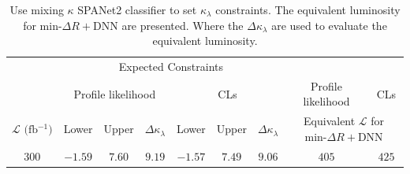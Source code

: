 \documentclass[12pt]{article}
\begin{document}
	\begin{table}[htpb]
		\centering
		\caption{Use mixing $\kappa$ SPANet2 classifier to set $\kappa_\lambda$ constraints. The equivalent luminosity for $\text{min-}\Delta R + \text{DNN}$ are presented. Where the $\Delta \kappa_\lambda$ are used to evaluate the equivalent luminosity.}
		\label{tab:kappa_constraint_equivalent_luminosity}
		\begin{tabular}{c|ccc|ccc|c|c}
															 & \multicolumn{6}{c}{Expected Constraints}                                                &                              &              \\
															 & \multicolumn{3}{c}{Profile likelihood}     & \multicolumn{3}{c}{CLs}                    & Profile likelihood           & CLs          \\ \hline
		$\mathcal{L} \text{ (fb$^{-1}$)}$ & Lower   & Upper  & $\Delta \kappa_\lambda$ & Lower   & Upper  & $\Delta \kappa_\lambda$ & \multicolumn{2}{c}{Equivalent $\mathcal{L}$ for $\text{min-}\Delta R + \text{DNN}$} \\ \hline
		300                                                  & $-1.59$ & $7.60$ & $9.19$                  & $-1.57$ & $7.49$ & $9.06$                  & $405$                          & $425$         
		\end{tabular}
	\end{table}
\end{document}
